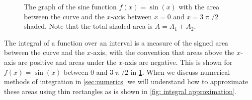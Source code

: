 \begin{figure}[htbp]
    \centering
{}
    \caption{The graph of the sine function  $f(x)=\sin(x)$ with the area between the curve and the $x$-axis between $x=0$ and $x=3\uppi/2$ shaded. Note that the total shaded area is $A=A_{1}+A_{2}$.}
        \label{fig: sine function graph shaded}
\end{figure}


The integral of a function over an interval is a measure of the signed area between the curve and the $x$-axis, with the convention that areas above the $x$-axis are positive and areas under the $x$-axis are negative.  This is shown for $f(x)=\sin(x)$ between $0$ and $3\uppi/2$ in \cref{fig: sine function graph shaded}. When we discuss numerical methods of integration in \cref{sec:numerics} we will understand how to approximate these areas using thin rectangles as is shown in \cref{fig: integral approximation}. \\

